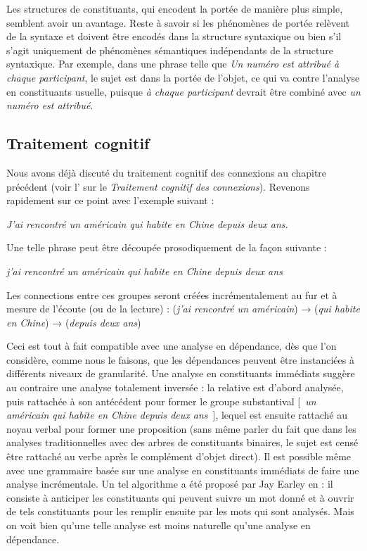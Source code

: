 {    Les structures de constituants, qui encodent la portée de manière plus simple, semblent avoir un avantage. Reste à savoir si les phénomènes de portée relèvent de la syntaxe et doivent être encodés dans la structure syntaxique ou bien s’il s’agit uniquement de phénomènes sémantiques indépendants de la structure syntaxique. Par exemple, dans une phrase telle que \textit{Un numéro est attribué à chaque participant}, le sujet est dans la portée de l’objet, ce qui va contre l’analyse en constituants usuelle, puisque \textit{à chaque participant} devrait être combiné avec \textit{un numéro est attribué}.

    \subsection{Traitement cognitif}

    Nous avons déjà discuté du traitement cognitif des connexions au chapitre précédent (voir l' sur le \textit{Traitement cognitif des connexions}). Revenons rapidement sur ce point avec l’exemple suivant :

    \ea
    \textit{{J’ai rencontré un américain qui habite en Chine depuis deux ans.}}
    \z

    Une telle phrase peut être découpée prosodiquement de la façon suivante :

    \ea
    \textit{{j’ai rencontré un américain}} {\textbar} \textit{qui habite en Chine} {\textbar} \textit{depuis deux ans}
    \z

    Les connections entre ces groupes seront créées incrémentalement au fur et à mesure de l’écoute (ou de la lecture) :
    \ea
    (\textit{j’ai rencontré un américain}) \textrm{→} (\textit{qui habite en Chine}) \textrm{→} (\textit{depuis deux ans})
    \z

    Ceci est tout à fait compatible avec une analyse en dépendance, dès que l'on considère, comme nous le faisons, que les dépendances peuvent être instanciées à différents niveaux de granularité. Une analyse en constituants immédiats suggère au contraire une analyse totalement inversée : la relative est d’abord analysée, puis rattachée à son antécédent pour former le groupe substantival [~\textit{un américain qui habite en Chine depuis deux ans}~], lequel est ensuite rattaché au noyau verbal pour former une proposition (sans même parler du fait que dans les analyses traditionnelles avec des arbres de constituants binaires, le sujet est censé être rattaché au verbe après le complément d’objet direct).
    Il est possible même avec une grammaire basée sur une analyse en constituants immédiats de faire une analyse incrémentale. Un tel algorithme a été proposé par Jay Earley en \citeyear{earley1970efficient} : il consiste à anticiper les constituants qui peuvent suivre un mot donné et à ouvrir de tels constituants pour les remplir ensuite par les mots qui sont analysés. Mais on voit bien qu’une telle analyse est moins naturelle qu’une analyse en dépendance.
}

